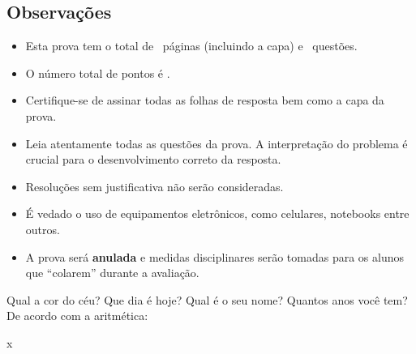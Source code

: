 \documentclass[12pt,addpoints,a4paper]{prova-ifb}
\begin{document}
\subsection*{Observações}
\begin{itemize}
	\item Esta prova tem o total de \numpages\ páginas (incluindo a capa) e \numquestions\ questões.
	\item O número total de pontos é \numpoints.
	\item Certifique-se de assinar todas as folhas de resposta bem como a capa da prova.
	\item Leia atentamente todas as questões da prova. A interpretação do problema é crucial para o desenvolvimento correto da resposta.
	\item Resoluções sem justificativa não serão consideradas.
	\item É vedado o uso de equipamentos eletrônicos, como celulares, notebooks entre outros.
	\item A prova será \textbf{anulada} e medidas disciplinares serão tomadas para os alunos que ``colarem'' durante a avaliação. 
	
\end{itemize}


\newpage

\begin{questions}
	
	\question[2] Qual a cor do céu?
	\question[2] Que dia é hoje?
	\question[2] Qual é o seu nome?
	\question[2] Quantos anos você tem?
	\question[2] De acordo com a aritmética:
	\begin{parts}
		\noaddpoints
		\part[1] 2+2?
		\part[1] 1+1?
		\addpoints
	\end{parts}
	x
\end{questions}
	
	
\end{document}
